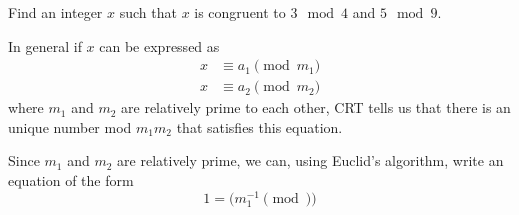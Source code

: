 \question Find an integer $x$ such that $x$ is congruent to $3 \mod 4$ and $5 \mod 9$.
\begin{solution}[1 in]
In general if $x$ can be expressed as 
\begin{align*}
    x &\equiv a_1 \pmod m_1 \\ 
    x &\equiv a_2 \pmod m_2
\end{align*}
where $m_1$ and $m_2$ are relatively prime to each other, CRT tells us that there is an unique number mod $m_1m_2$ that satisfies this equation. 

Since $m_1$ and $m_2$ are relatively prime, we can, using Euclid's algorithm, write an equation of the form 
\[ 1 = (m_1^{-1} \pmod ) \]
\end{solution}
